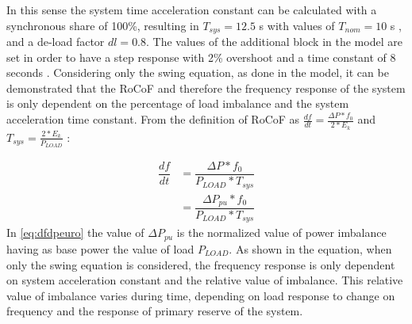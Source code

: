 In this sense the system time acceleration constant can be calculated with a synchronous share of 100\%, resulting in $ T_{sys}=12.5 $ s  with values of $ T_{nom}=10 $ s \cite{ENTSOE.2016}\cite{Anderson.2002}, and a de-load factor $ dl=0.8 $.
The values of the additional block in the model are set in order to have a step response with 2\% overshoot and a time constant of 8 seconds \cite{ogata1999ingenieria}.
Considering only the swing equation, as done in the model, it can be demonstrated that the RoCoF and therefore the frequency response of the system is only dependent on the percentage of load imbalance and the system acceleration time constant.
From the definition of RoCoF as $ \frac{df}{dt}=\frac{\Delta P*f_0}{2*E_k} $ and  $ T_{sys}=\frac{2*E_k}{P_{LOAD}} $ :

\begin{align}
	\dfrac{df}{dt} &=\dfrac{\Delta P*f_0}{P_{LOAD}*T_{sys}} \nonumber\\
	&=\dfrac{\Delta P_{pu}*f_0}{P_{LOAD}*T_{sys}}
	\label{eq:dfdpeuro}
\end{align}
In \eqref{eq:dfdpeuro} the value of $ \Delta P_{pu} $ is the normalized value of power imbalance having as base power the value of load $ P_{LOAD} $. As shown in the equation, when only the swing equation is considered, the frequency response is only dependent on system acceleration constant and the relative value of imbalance. This relative value of imbalance varies during time, depending on load response to change on frequency and the response of primary reserve of the system.
